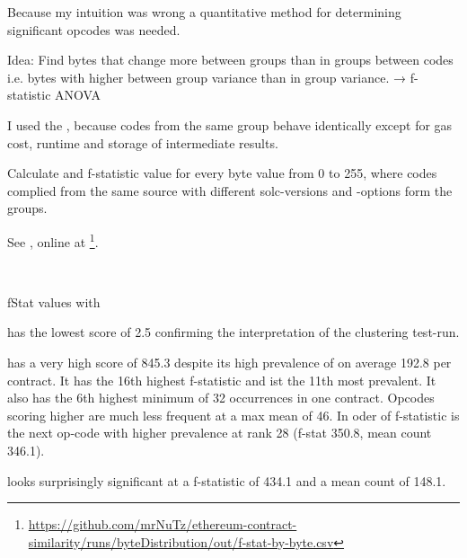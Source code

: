 \documentclass[../main.tex]{subfiles}
\begin{document}
Because my intuition was wrong a quantitative method for determining significant opcodes was needed.

Idea: Find bytes that change more between groups than in groups between codes i.e. bytes with higher between group variance than in group variance. → f-statistic ANOVA

I used the , because codes from the same group behave identically except for gas cost, runtime and storage of intermediate results.

Calculate and f-statistic value for every byte value from 0 to 255, where codes complied from the same source with different solc-versions and -options form the groups.

See , online at \footnote{\url{https://github.com/mrNuTz/ethereum-contract-similarity/runs/byteDistribution/out/f-stat-by-byte.csv}}.

\begin{table}[ht!]
  \centering
  \scriptsize %
  \parbox{5em}{~}
  \caption{fStat values with \n{\solcts}}
  \label{tbl:solcFstat}
\end{table}

 has the lowest score of 2.5 confirming the interpretation of the clustering test-run.

 has a very high score of 845.3 despite its high prevalence of on average 192.8 per contract. It has the 16th highest f-statistic and ist the 11th most prevalent. It also has the 6th highest minimum of 32 occurrences in one contract. Opcodes scoring higher are much less frequent at a max mean of 46. In oder of f-statistic  is the next op-code with higher prevalence at rank 28 (f-stat 350.8, mean count 346.1).

 looks surprisingly significant at a f-statistic of 434.1 and a mean count of 148.1.
\end{document}
